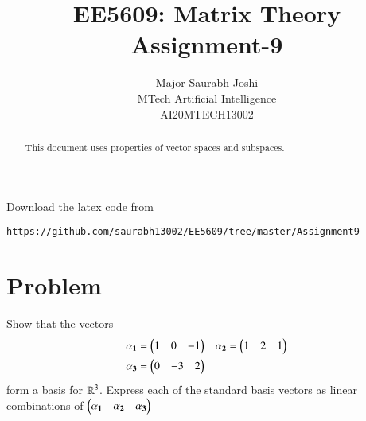 \documentclass[journal,12pt,twocolumn]{IEEEtran}
\begin{document}
\renewcommand{\thefigure}{\theproblem}

\def\putbox#1#2#3{\makebox[0in][l]{\makebox[#1][l]{}\raisebox{\baselineskip}[0in][0in]{\raisebox{#2}[0in][0in]{#3}}}}
     \def\rightbox#1{\makebox[0in][r]{#1}}
     \def\centbox#1{\makebox[0in]{#1}}
     \def\topbox#1{\raisebox{-\baselineskip}[0in][0in]{#1}}
     \def\midbox#1{\raisebox{-0.5\baselineskip}[0in][0in]{#1}}
\vspace{3cm}
\title{EE5609: Matrix Theory\\Assignment-9}
\author{Major Saurabh Joshi\\MTech Artificial Intelligence\\AI20MTECH13002 }
\maketitle

\bigskip
\renewcommand{\thefigure}{\theenumi}
\renewcommand{\thetable}{\theenumi}
\begin{abstract}
This  document uses properties of vector spaces and subspaces. 
\end{abstract}
Download the latex code from 
%
%
%
\begin{lstlisting}
https://github.com/saurabh13002/EE5609/tree/master/Assignment9
\end{lstlisting}
%
\section{Problem}
Show that the vectors 
\begin{align}
& \mathbf{\alpha_1} = \begin{pmatrix}1 & 0 & -1\end{pmatrix} & \mathbf{\alpha_2} = \begin{pmatrix}1 & 2 & 1 \end{pmatrix} \\
& \mathbf{\alpha_3} = \begin{pmatrix}0 & -3 & 2\end{pmatrix}
\end{align}
form a basis for $\mathbb{R}^3$. Express each of the standard basis vectors as linear combinations
of $\begin{pmatrix}\mathbf{\alpha_1} &  \mathbf{\alpha_2} & \mathbf{\alpha_3}\end{pmatrix}$
\end{document}
